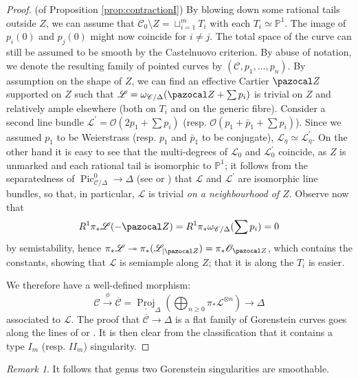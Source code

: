 \documentclass{compositio}
\newcommand{\PP}{\mathbb P}
\newcommand{\OO}{\mathcal O}
\renewcommand{\to}{\rightarrow}
\newcommand{\dvr}{\Delta}
\newcommand{\Pic}{\operatorname{Pic}}
\theoremstyle{plain}
\theoremstyle{definition}
\theoremstyle{remark}
\newtheorem{rem}[thm]{Remark}
\begin{document}
\begin{proof}(of Proposition \ref{prop:contractionI})
 By blowing down some rational tails outside $Z$, we can assume that $\mathcal C_0\setminus Z=\sqcup_{i=1}^m T_i$ with each $T_i\simeq\PP^1$. The image of $p_i(0)$ and $p_j(0)$ might now coincide for $i\neq j$. The total space of the curve can still be assumed to be smooth by the Castelnuovo criterion. By abuse of notation, we denote the resulting family of pointed curves by $(\mathcal C,p_1,\ldots,p_n)$. By assumption on the shape of $Z$, we can find an effective Cartier $\pazocal Z$ supported on $Z$ such that $\mathcal L=\omega_{\mathcal C/\dvr}(\pazocal Z+\sum p_i)$ is trivial on $Z$ and relatively ample elsewhere (both on $T_i$ and on the generic fibre). Consider a second line bundle $\mathcal L^\prime=\OO(2p_1+\sum p_i)$ (resp. $\OO(p_1+\bar p_1+\sum p_i)$). Since we assumed $p_1$ to be Weierstrass (resp. $p_1$ and $\bar p_1$ to be conjugate), $\mathcal L_\eta\simeq\mathcal L^\prime_\eta$. On the other hand it is easy to see that the multi-degrees of $\mathcal L_0$ and $\mathcal L^\prime_0$ coincide, as $Z$ is unmarked and each rational tail is isomorphic to $\PP^1$; it follows from the separatedness of $\Pic^0_{\mathcal C/\dvr}\to\dvr$ (see \cite[p. 136]{Deligne-Gabber} or \cite[\S 9.4]{BLR}) that $\mathcal L$ and $\mathcal L^\prime$ are isomorphic line bundles, so that, in particular, $\mathcal L$ is trivial \emph{on a neighbourhood of $Z$}. Observe now that 
 \[R^1\pi_*\mathcal L(-{\pazocal Z})= R^1\pi_*\omega_{\mathcal C/\dvr}(\sum p_i)=0\]
 by semistability, hence $\pi_*\mathcal L\twoheadrightarrow \pi_*(\mathcal L_{|{\pazocal Z}})=\pi_*\OO_{\pazocal Z}$, which contains the constants, showing that $\mathcal L$ is semiample along $Z$; that it is along the $T_i$ is easier.
 
 We therefore have a well-defined  morphism:
 \[\mathcal C\xrightarrow{\phi}\overline{\mathcal C}=\underline{\operatorname{Proj}}_\dvr\left(\bigoplus_{n\geq 0}\pi_*\mathcal L^{\otimes n}\right)\to\dvr\]
 associated to $\mathcal L$. The proof that $\overline{\mathcal C}\to \dvr$ is a flat family of Gorenstein curves goes along the lines of \cite[Lemma 2.13]{SMY1} or \cite[Proposition 3.7.3.1]{RSPW1}. It is then clear from the classification that it contains a type $I_m$ (resp. $I\!I_m$) singularity.
 
\end{proof}

\begin{rem}\label{rem:smoothable_sing}
 It follows that genus two Gorenstein singularities are smoothable.
\end{rem}
\end{document}
